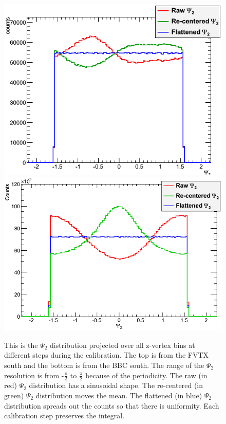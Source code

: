 \begin{figure}[!h]
\begin{center}
\includegraphics[width=0.65\linewidth]{figs/flattened_example_fvtx.png}
\includegraphics[width=0.62\linewidth]{figs/flattened_example_bbc.png}
\caption{This is the $\Psi_2$ distribution projected over all z-vertex bins at different steps during the calibration. The top is from the FVTX south and the bottom is from the BBC south. The range of the $\Psi_2$ resolution is from -$\frac{\pi}{2}$ to $\frac{\pi}{2}$ because of the periodicity. The raw (in red) $\Psi_2$ distribution has a sinusoidal shape. The re-centered (in green) $\Psi_2$ distribution moves the mean. The flattened (in blue) $\Psi_2$ distribution spreads out the counts so that there is uniformity. Each calibration step preserves the integral.}
\end{center}
\label{fig:calibrated_psi}
\end{figure}

